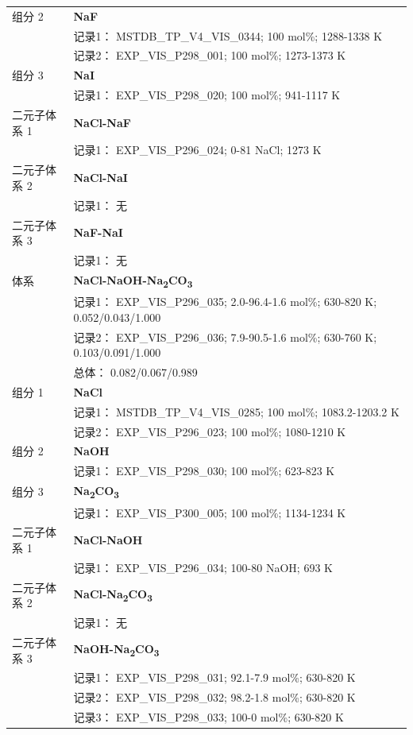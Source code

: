 \documentclass[12pt]{article}
\begin{document}
{\begin{longtable}[]{@{}
  >{\raggedright\arraybackslash}p{}
  >{\raggedright\arraybackslash}p{}@{}}
组分 2  & \textbf{NaF} \\
 & 记录1： MSTDB\_TP\_V4\_VIS\_0344; 100 mol\%; 1288-1338 K \\
 & 记录2： EXP\_VIS\_P298\_001; 100 mol\%; 1273-1373 K  \\

组分 3  & \textbf{NaI} \\
 & 记录1： EXP\_VIS\_P298\_020; 100 mol\%; 941-1117 K  \\

二元子体系 1  & \textbf{NaCl-NaF} \\
 & 记录1： EXP\_VIS\_P296\_024; 0-81 NaCl; 1273 K  \\

二元子体系 2 & \textbf{NaCl-NaI} \\
 & 记录1： 无 \\
二元子体系 3 & \textbf{NaF-NaI} \\
 & 记录1： 无 \\
\midrule
体系 & \textbf{NaCl-NaOH-Na\textsubscript{2}CO\textsubscript{3}} \\
 & 记录1： EXP\_VIS\_P296\_035; 2.0-96.4-1.6 mol\%; 630-820 K; 0.052/0.043/1.000 \\
 & 记录2： EXP\_VIS\_P296\_036; 7.9-90.5-1.6 mol\%; 630-760 K; 0.103/0.091/1.000 \\
 & 总体： 0.082/0.067/0.989  \\

组分 1  & \textbf{NaCl} \\
 & 记录1： MSTDB\_TP\_V4\_VIS\_0285; 100 mol\%; 1083.2-1203.2 K \\
 & 记录2： EXP\_VIS\_P296\_023; 100 mol\%; 1080-1210 K  \\

组分 2  & \textbf{NaOH} \\
 & 记录1： EXP\_VIS\_P298\_030; 100 mol\%; 623-823 K  \\

组分 3  & \textbf{Na\textsubscript{2}CO\textsubscript{3}} \\
 & 记录1： EXP\_VIS\_P300\_005; 100 mol\%; 1134-1234 K  \\

二元子体系 1  & \textbf{NaCl-NaOH} \\
 & 记录1： EXP\_VIS\_P296\_034; 100-80 NaOH; 693 K  \\

二元子体系 2 & \textbf{NaCl-Na\textsubscript{2}CO\textsubscript{3}} \\
 & 记录1： 无 \\
二元子体系 3  & \textbf{NaOH-Na\textsubscript{2}CO\textsubscript{3}} \\
 & 记录1： EXP\_VIS\_P298\_031; 92.1-7.9 mol\%; 630-820 K \\
 & 记录2： EXP\_VIS\_P298\_032; 98.2-1.8 mol\%; 630-820 K \\
 & 记录3： EXP\_VIS\_P298\_033; 100-0 mol\%; 630-820 K  \\


\end{longtable}}
\end{document}
